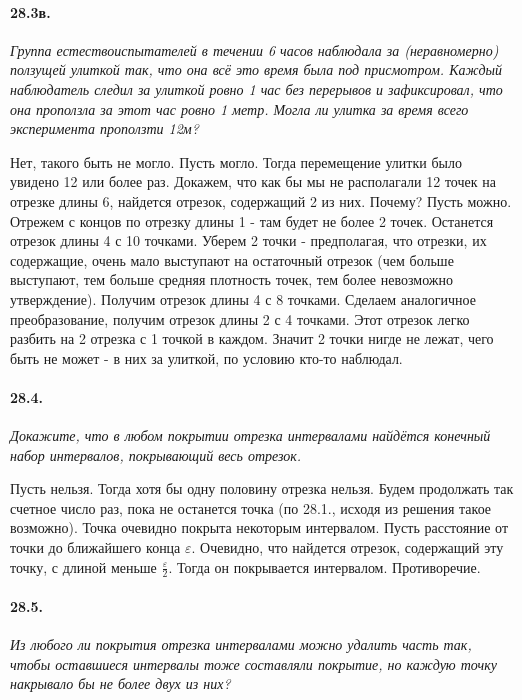 \documentclass{book}
\begin{document}
\paragraph{28.3в.}
\textit{Группа естествоиспытателей в течении 6 часов наблюдала за (неравномерно)
ползущей улиткой так, что она всё это время была под присмотром. Каждый наблюдатель
следил за улиткой ровно 1 час без перерывов и зафиксировал, что она проползла за этот
час ровно 1 метр. Могла ли улитка за время всего эксперимента проползти 12м?}

Нет, такого быть не могло. Пусть могло. Тогда перемещение улитки было увидено 12 или более раз. Докажем, что как бы мы не располагали 12 точек на отрезке длины 6, найдется отрезок, содержащий 2 из них. Почему? Пусть можно. Отрежем с концов по отрезку длины 1 - там будет не более 2 точек. Останется отрезок длины 4 с 10 точками. Уберем 2 точки - предполагая, что отрезки, их содержащие, очень мало выступают на остаточный отрезок (чем больше выступают, тем больше средняя плотность точек, тем более невозможно утверждение). Получим отрезок длины 4 с 8 точками. Сделаем аналогичное преобразование, получим отрезок длины 2 с 4 точками. Этот отрезок легко разбить на 2 отрезка с 1 точкой в каждом. Значит 2 точки нигде не лежат, чего быть не может - в них за улиткой, по условию кто-то наблюдал. 

\paragraph{28.4.}
\textit{Докажите, что в любом покрытии отрезка
интервалами найдётся конечный набор интервалов, покрывающий весь отрезок.}

Пусть нельзя. Тогда хотя бы одну половину отрезка нельзя. Будем продолжать так счетное число раз, пока не останется точка (по 28.1., исходя из решения такое возможно). Точка очевидно покрыта некоторым интервалом. Пусть расстояние от точки до ближайшего конца $\varepsilon$. Очевидно, что найдется отрезок, содержащий эту точку, с длиной меньше $\frac{\varepsilon}{2}$. Тогда он покрывается интервалом. Противоречие.

\paragraph{28.5.}
\textit{Из любого ли покрытия отрезка интервалами можно удалить часть так, чтобы оставшиеся интервалы тоже составляли покрытие, но каждую точку накрывало бы не более двух из них?}
\end{document}

